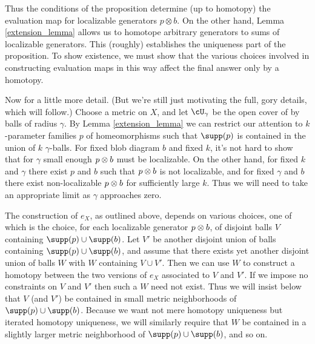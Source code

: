 Thus the conditions of the proposition determine (up to homotopy) the evaluation
map for localizable generators $p\otimes b$.
On the other hand, Lemma \ref{extension_lemma} allows us to homotope 
arbitrary generators to sums of localizable generators.
This (roughly) establishes the uniqueness part of the proposition.
To show existence, we must show that the various choices involved in constructing
evaluation maps in this way affect the final answer only by a homotopy.

Now for a little more detail.
(But we're still just motivating the full, gory details, which will follow.)
Choose a metric on $X$, and let $\cU_\gamma$ be the open cover of by balls of radius $\gamma$.
By Lemma \ref{extension_lemma} we can restrict our attention to $k$-parameter families 
$p$ of homeomorphisms such that $\supp(p)$ is contained in the union of $k$ $\gamma$-balls.
For fixed blob diagram $b$ and fixed $k$, it's not hard to show that for $\gamma$ small enough
$p\otimes b$ must be localizable.
On the other hand, for fixed $k$ and $\gamma$ there exist $p$ and $b$ such that $p\otimes b$ is not localizable,
and for fixed $\gamma$ and $b$ there exist non-localizable $p\otimes b$ for sufficiently large $k$.
Thus we will need to take an appropriate limit as $\gamma$ approaches zero.

The construction of $e_X$, as outlined above, depends on various choices, one of which 
is the choice, for each localizable generator $p\otimes b$, 
of disjoint balls $V$ containing $\supp(p)\cup\supp(b)$.
Let $V'$ be another disjoint union of balls containing $\supp(p)\cup\supp(b)$,
and assume that there exists yet another disjoint union of balls $W$ with $W$ containing 
$V\cup V'$.
Then we can use $W$ to construct a homotopy between the two versions of $e_X$ 
associated to $V$ and $V'$.
If we impose no constraints on $V$ and $V'$ then such a $W$ need not exist.
Thus we will insist below that $V$ (and $V'$) be contained in small metric neighborhoods
of $\supp(p)\cup\supp(b)$.
Because we want not mere homotopy uniqueness but iterated homotopy uniqueness,
we will similarly require that $W$ be contained in a slightly larger metric neighborhood of 
$\supp(p)\cup\supp(b)$, and so on.


\medskip


